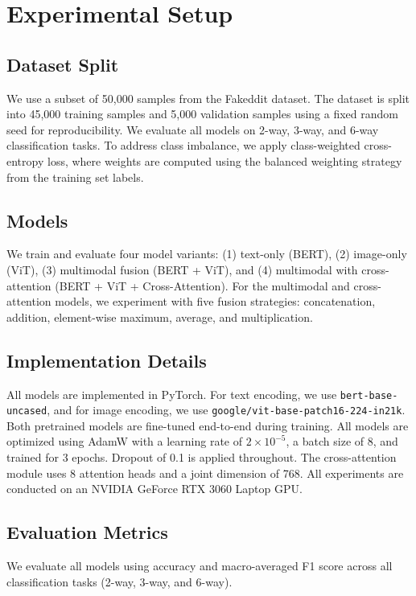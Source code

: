 \section{Experimental Setup}

\subsection{Dataset Split}

We use a subset of 50,000 samples from the Fakeddit dataset. The dataset is split into 45,000 training samples and 5,000 validation samples using a fixed random seed for reproducibility. We evaluate all models on 2-way, 3-way, and 6-way classification tasks. To address class imbalance, we apply class-weighted cross-entropy loss, where weights are computed using the balanced weighting strategy from the training set labels.

\subsection{Models}

We train and evaluate four model variants: (1) text-only (BERT), (2) image-only (ViT), (3) multimodal fusion (BERT + ViT), and (4) multimodal with cross-attention (BERT + ViT + Cross-Attention). For the multimodal and cross-attention models, we experiment with five fusion strategies: concatenation, addition, element-wise maximum, average, and multiplication.

\subsection{Implementation Details}

All models are implemented in PyTorch. For text encoding, we use \texttt{bert-base-uncased}, and for image encoding, we use \texttt{google/vit-base-patch16-224-in21k}. Both pretrained models are fine-tuned end-to-end during training. All models are optimized using AdamW with a learning rate of $2 \times 10^{-5}$, a batch size of 8, and trained for 3 epochs. Dropout of 0.1 is applied throughout. The cross-attention module uses 8 attention heads and a joint dimension of 768. All experiments are conducted on an NVIDIA GeForce RTX 3060 Laptop GPU.

\subsection{Evaluation Metrics}

We evaluate all models using accuracy and macro-averaged F1 score across all classification tasks (2-way, 3-way, and 6-way).